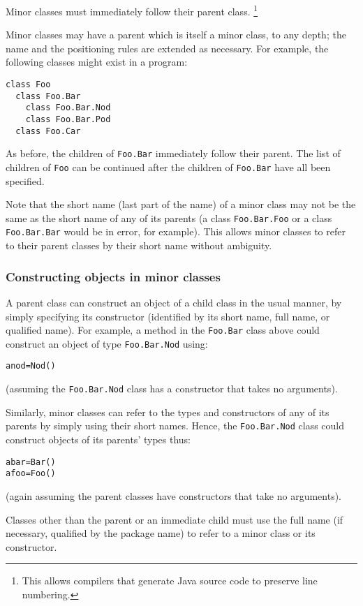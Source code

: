 Minor classes must immediately follow their parent class.
\footnote{
This allows compilers that generate Java source code to preserve line
numbering.
}
 
Minor classes may have a parent which is itself a minor class,
to any depth; the name and the positioning rules are extended as
necessary.  For example, the following classes might exist in a program:
\begin{lstlisting}
class Foo
  class Foo.Bar
    class Foo.Bar.Nod
    class Foo.Bar.Pod
  class Foo.Car
\end{lstlisting}
 
As before, the children of \texttt{Foo.Bar} immediately follow their
parent.  The list of children of \texttt{Foo} can be continued after
the children of \texttt{Foo.Bar} have all been specified.
 
Note that the short name (last part of the name) of a minor class may
not be the same as the short name of any of its parents (a
class \texttt{Foo.Bar.Foo} or a class \texttt{Foo.Bar.Bar} would be in
error, for example).  This allows minor classes to refer to their parent
classes by their short name without ambiguity.
\subsubsection{Constructing objects in minor classes}
 
A parent class can construct an object of a child class in the usual
manner, by simply specifying its constructor (identified by its short
name, full name, or qualified name).
For example, a method in the \texttt{Foo.Bar} class above could construct
an object of type \texttt{Foo.Bar.Nod} using:
\begin{lstlisting}
anod=Nod()
\end{lstlisting}
(assuming the \texttt{Foo.Bar.Nod} class has a constructor that takes no
arguments).
 
Similarly, minor classes can refer to the types and constructors of any
of its parents by simply using their short names.
Hence, the \texttt{Foo.Bar.Nod} class could construct objects of its
parents' types thus:
\begin{lstlisting}
abar=Bar()
afoo=Foo()
\end{lstlisting}
(again assuming the parent classes have constructors that take no
arguments).
 
Classes other than the parent or an immediate child must use the full
name (if necessary, qualified by the package name) to refer to a minor
class or its constructor.
